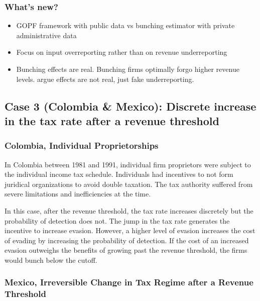 \documentclass[
  12pt]{article}
\providecommand{\tightlist}{%
  \setlength{\itemsep}{0pt}\setlength{\parskip}{0pt}}\usepackage{longtable,booktabs,array}
\begin{document}
\subsubsection{What's new?}\label{whats-new}

\begin{itemize}
\tightlist
\item
  GOPF framework with public data vs bunching estimator with private
  administrative data
\item
  Focus on input overreporting rather than on revenue underreporting
\item
  Bunching effects are real. Bunching firms optimally forgo higher
  revenue levels. \citet{Almunia2018} argue effects are not real, just
  fake underreporting.
\end{itemize}

\subsection{Case 3 (Colombia \& Mexico): Discrete increase in the tax
rate after a revenue
threshold}\label{case-3-colombia-mexico-discrete-increase-in-the-tax-rate-after-a-revenue-threshold}

\subsubsection{Colombia, Individual
Proprietorships}\label{colombia-individual-proprietorships}

In Colombia between 1981 and 1991, individual firm proprietors were
subject to the individual income tax schedule. Individuals had
incentives to not form juridical organizations to avoid double taxation.
The tax authority suffered from severe limitations and inefficiencies at
the time.

In this case, after the revenue threshold, the tax rate increases
discretely but the probability of detection does not. The jump in the
tax rate generates the incentive to increase evasion. However, a higher
level of evasion increases the cost of evading by increasing the
probability of detection. If the cost of an increased evasion outweighs
the benefits of growing past the revenue threshold, the firms would
bunch below the cutoff.

\subsubsection{Mexico, Irreversible Change in Tax Regime after a Revenue
Threshold}\label{mexico-irreversible-change-in-tax-regime-after-a-revenue-threshold}
\end{document}
